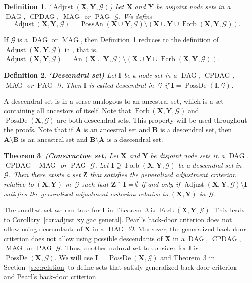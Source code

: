 \documentclass[11pt,a4paper]{article}
\newtheorem{definition}{Definition}
\newtheorem{theorem}[definition]{Theorem}
\DeclareMathOperator{\CPDAG}{CPDAG}
\DeclareMathOperator{\DAG}{DAG}
\DeclareMathOperator{\MAG}{MAG}
\DeclareMathOperator{\PAG}{PAG}
\DeclareMathOperator{\PossDe}{PossDe}
\DeclareMathOperator{\An}{An}
\DeclareMathOperator{\PossAn}{PossAn}
\DeclareMathOperator{\Adjust}{Adjust}
\DeclareMathOperator{\Forbi}{Forb}
\newcommand{\g}[1][G]{\mathcal{#1}}
\newcommand{\adjustb}[2][X,Y]{\Adjust(\mathbf{#1},#2)}
\newcommand{\fb}[2][X,Y]{\Forbi(\mathbf{#1},#2)}%
\begin{document}
\begin{definition}{($\adjustb{\g}$)}
Let $\mathbf{X}$ and $\mathbf{Y}$ be disjoint node sets in a $\DAG$, $\CPDAG$, $\MAG$ or $\PAG$ $\g$. We define
\begin{equation}
\adjustb{\g}=\PossAn(\mathbf{X} \cup \mathbf{Y}, \g)\setminus(\mathbf{X} \cup \mathbf{Y} \cup \fb{\g}).
\end{equation}
\label{def:adjust xy}
\end{definition}
\noindent{}If $\g$ is a $\DAG$ or $\MAG$, then Definition~\ref{def:adjust xy} reduces to the definition of $\adjustb{\g}$ in \citet{vanconstructing}, that is, $\adjustb{\g} = \An(\mathbf{X} \cup \mathbf{Y},\g) \setminus (\mathbf{X} \cup \mathbf{Y} \cup \fb{\g})$.

\begin{definition} \textbf{(Descendral set)}
Let $\mathbf{I}$ be a node set in a $\DAG$, $\CPDAG$, $\MAG$ or $\PAG$ $\g$. Then $\mathbf{I}$ is called descendral in~$\g$ if $\mathbf{I} = \PossDe(\mathbf{I},\g)$.
\label{def:descendral}
\end{definition}

\noindent{}A descendral set is in a sense analogous to an ancestral set, which is a set containing all ancestors of itself. Note that $\fb{\g}$ and $\PossDe(\mathbf{X},\g)$ are both descendral sets. This property will be used throughout the proofs. 
Note that if $\mathbf{A}$ is an ancestral set and $\mathbf{B}$ is a descendral set, then $\mathbf{A} \setminus \mathbf{B}$ is an ancestral set and $\mathbf{B} \setminus \mathbf{A}$ is a descendral set.

\begin{theorem}(\textbf{Constructive set})
Let $\mathbf{X}$ and $\mathbf{Y}$ be disjoint node sets in a $\DAG$, $\CPDAG$, $\MAG$ or $\PAG$ $\g$. Let $\mathbf{I} \supseteq \fb{\g}$ be a descendral set in~$\g$. Then there exists a set $\mathbf{Z}$ that satisfies the generalized adjustment criterion relative to $(\mathbf{X,Y})$ in~$\g$ such that $\mathbf{Z} \cap \mathbf{I} = \emptyset$ if and only if $\adjustb{\g} \setminus \mathbf{I}$ satisfies the generalized adjustment criterion relative to $(\mathbf{X,Y})$ in~$\g$.
\label{theorem:general set proof}
\end{theorem}

\noindent{}The smallest set we can take for $\mathbf{I}$ in Theorem~\ref{theorem:general set proof} is $\fb{\g}$. This leads to Corollary~\ref{cor:adjust xy gac general}. Pearl's back-door criterion does not allow using descendants of $\mathbf{X}$ in a $\DAG$ $\g[D]$. Moreover, the generalized back-door criterion does not allow using possible descendants of $\mathbf{X}$ in a $\DAG$, $\CPDAG$, $\MAG$ or $\PAG$ $\g$. 
Thus, another natural set to consider for $\mathbf{I}$ is $\PossDe(\mathbf{X},\g)$. We will use $\mathbf{I} = \PossDe(\mathbf{X},\g)$ and Theorem~\ref{theorem:general set proof} in Section~\ref{sec:relation} to define sets that satisfy generalized back-door criterion and Pearl's back-door criterion.
\end{document}
